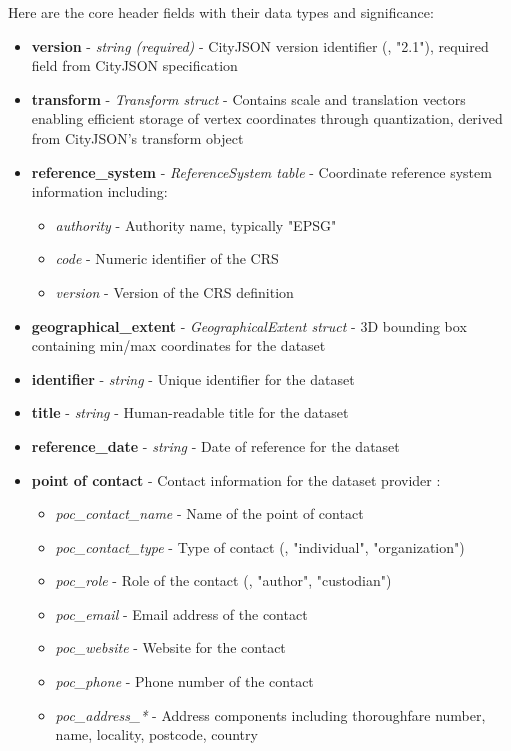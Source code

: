 Here are the core header fields with their data types and significance:

\begin{itemize}
  \item \textbf{version} - \textit{string (required)} - CityJSON version identifier (\eg, "2.1"), required field from CityJSON specification \citep{cityjson_spec}

  \item \textbf{transform} - \textit{Transform struct} - Contains scale and translation vectors enabling efficient storage of vertex coordinates through quantization, derived from CityJSON's transform object \citep{cityjson_spec}

  \item \textbf{reference\_system} - \textit{ReferenceSystem table} - Coordinate reference system information including:
    \begin{itemize}
      \item \textit{authority} - Authority name, typically "EPSG"
      \item \textit{code} - Numeric identifier of the CRS
      \item \textit{version} - Version of the CRS definition
    \end{itemize}

  \item \textbf{geographical\_extent} - \textit{GeographicalExtent struct} - 3D bounding box containing min/max coordinates for the dataset \citep{cityjson_spec}

  \item \textbf{identifier} - \textit{string} - Unique identifier for the dataset

  \item \textbf{title} - \textit{string} - Human-readable title for the dataset

  \item \textbf{reference\_date} - \textit{string} - Date of reference for the dataset

  \item \textbf{point of contact} - Contact information for the dataset provider \citep{cityjson_spec}:
    \begin{itemize}
      \item \textit{poc\_contact\_name} - Name of the point of contact
      \item \textit{poc\_contact\_type} - Type of contact (\eg, "individual", "organization")
      \item \textit{poc\_role} - Role of the contact (\eg, "author", "custodian")
      \item \textit{poc\_email} - Email address of the contact
      \item \textit{poc\_website} - Website for the contact
      \item \textit{poc\_phone} - Phone number of the contact
      \item \textit{poc\_address\_*} - Address components including thoroughfare number, name, locality, postcode, country
    \end{itemize}
\end{itemize}



